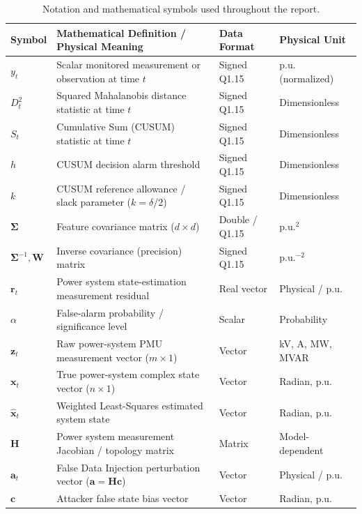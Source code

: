 \documentclass[12pt,a4paper]{report}
\begin{document}
\begin{table}[H]
\centering
\caption{Notation and mathematical symbols used throughout the report.}
\label{tab:notation}
\small
\renewcommand{\arraystretch}{1.25}
\begin{tabular}{|p{2.2cm}|p{7.2cm}|p{2.6cm}|p{2.2cm}|}
\hline
\textbf{Symbol} & \textbf{Mathematical Definition / Physical Meaning} & \textbf{Data Format} & \textbf{Physical Unit} \\
\hline
$y_t$ & Scalar monitored measurement or observation at time $t$ & Signed Q1.15 & p.u. (normalized) \\
\hline
$D_t^2$ & Squared Mahalanobis distance statistic at time $t$ & Signed Q1.15 & Dimensionless \\
\hline
$S_t$ & Cumulative Sum (CUSUM) statistic at time $t$ & Signed Q1.15 & Dimensionless \\
\hline
$h$ & CUSUM decision alarm threshold & Signed Q1.15 & Dimensionless \\
\hline
$k$ & CUSUM reference allowance / slack parameter ($k = \delta/2$) & Signed Q1.15 & Dimensionless \\
\hline
$\boldsymbol{\Sigma}$ & Feature covariance matrix ($d \times d$) & Double / Q1.15 & $\text{p.u.}^2$ \\
\hline
$\boldsymbol{\Sigma}^{-1}, \boldsymbol{W}$ & Inverse covariance (precision) matrix & Signed Q1.15 & $\text{p.u.}^{-2}$ \\
\hline
$\boldsymbol{r}_t$ & Power system state-estimation measurement residual & Real vector & Physical / p.u. \\
\hline
$\alpha$ & False-alarm probability / significance level & Scalar & Probability \\
\hline
$\boldsymbol{z}_t$ & Raw power-system PMU measurement vector ($m \times 1$) & Vector & kV, A, MW, MVAR \\
\hline
$\boldsymbol{x}_t$ & True power-system complex state vector ($n \times 1$) & Vector & Radian, p.u. \\
\hline
$\hat{\boldsymbol{x}}_t$ & Weighted Least-Squares estimated system state & Vector & Radian, p.u. \\
\hline
$\boldsymbol{H}$ & Power system measurement Jacobian / topology matrix & Matrix & Model-dependent \\
\hline
$\boldsymbol{a}_t$ & False Data Injection perturbation vector ($\boldsymbol{a} = \boldsymbol{H}\boldsymbol{c}$) & Vector & Physical / p.u. \\
\hline
$\boldsymbol{c}$ & Attacker false state bias vector & Vector & Radian, p.u. \\

\end{tabular}
\end{table}
\end{document}
